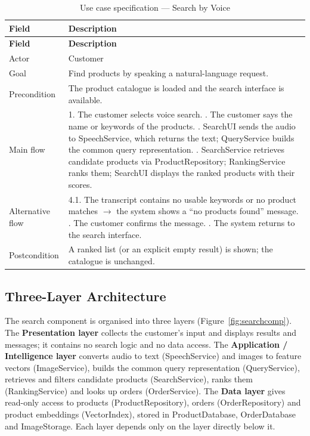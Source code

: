 {\small
\begin{xltabular}{\textwidth}{@{}L{2.6cm} Y@{}}
\caption{Use case specification --- Search by Voice}\label{tab:ucvoice}\\
\toprule
\textbf{Field} & \textbf{Description} \\ \midrule
\endfirsthead
\toprule
\textbf{Field} & \textbf{Description} \\ \midrule
\endhead
\bottomrule
\endlastfoot
Actor & Customer \\
Goal & Find products by speaking a natural-language request. \\
Precondition & The product catalogue is loaded and the search interface is available. \\
Main flow & 1. The customer selects voice search. . The customer says the name or keywords of the products. . SearchUI sends the audio to SpeechService, which returns the text; QueryService builds the common query representation. . SearchService retrieves candidate products via ProductRepository; RankingService ranks them; SearchUI displays the ranked products with their scores. \\
Alternative flow & 4.1. The transcript contains no usable keywords or no product matches $\rightarrow$ the system shows a ``no products found'' message. . The customer confirms the message. . The system returns to the search interface. \\
Postcondition & A ranked list (or an explicit empty result) is shown; the catalogue is unchanged. \\
\end{xltabular}
}

\subsection{Three-Layer Architecture}
\label{subsec:searcharch}
The search component is organised into three layers (Figure~\ref{fig:searchcomp}). The \textbf{Presentation layer} collects the customer's input and displays results and messages; it contains no search logic and no data access. The \textbf{Application / Intelligence layer} converts audio to text (SpeechService) and images to feature vectors (ImageService), builds the common query representation (QueryService), retrieves and filters candidate products (SearchService), ranks them (RankingService) and looks up orders (OrderService). The \textbf{Data layer} gives read-only access to products (ProductRepository), orders (OrderRepository) and product embeddings (VectorIndex), stored in ProductDatabase, OrderDatabase and ImageStorage. Each layer depends only on the layer directly below it.

